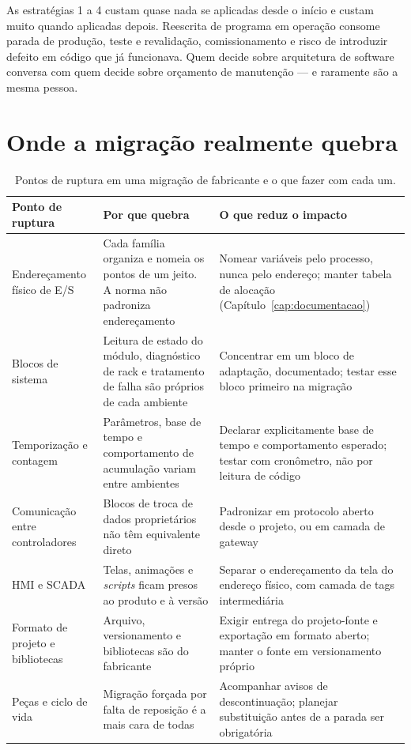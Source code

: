 \begin{atencao}
As estratégias 1 a 4 custam quase nada se aplicadas desde o início e custam muito quando aplicadas
depois. Reescrita de programa em operação consome parada de produção, teste e revalidação,
comissionamento e risco de introduzir defeito em código que já funcionava. Quem decide sobre
arquitetura de software conversa com quem decide sobre orçamento de manutenção --- e raramente são a
mesma pessoa.
\end{atencao}

\section{Onde a migração realmente quebra}

\begin{table}[H]
  \centering
  \caption{Pontos de ruptura em uma migração de fabricante e o que fazer com cada um.}
  \label{tab:rupturas-migracao}
  \begin{tabular}{p{3.4cm} p{5.2cm} p{5.7cm}}
    \toprule
    Ponto de ruptura & Por que quebra & O que reduz o impacto \\
    \midrule
    Endereçamento físico de E/S
      & Cada família organiza e nomeia os pontos de um jeito. A norma não padroniza endereçamento
      & Nomear variáveis pelo processo, nunca pelo endereço; manter tabela de alocação
        (Capítulo~\ref{cap:documentacao}) \\
    \addlinespace
    Blocos de sistema
      & Leitura de estado do módulo, diagnóstico de rack e tratamento de falha são próprios de cada
        ambiente
      & Concentrar em um bloco de adaptação, documentado; testar esse bloco primeiro na migração \\
    \addlinespace
    Temporização e contagem
      & Parâmetros, base de tempo e comportamento de acumulação variam entre ambientes
      & Declarar explicitamente base de tempo e comportamento esperado; testar com cronômetro, não
        por leitura de código \\
    \addlinespace
    Comunicação entre controladores
      & Blocos de troca de dados proprietários não têm equivalente direto
      & Padronizar em protocolo aberto desde o projeto, ou em camada de gateway \\
    \addlinespace
    HMI e SCADA
      & Telas, animações e \emph{scripts} ficam presos ao produto e à versão
      & Separar o endereçamento da tela do endereço físico, com camada de tags intermediária \\
    \addlinespace
    Formato de projeto e bibliotecas
      & Arquivo, versionamento e bibliotecas são do fabricante
      & Exigir entrega do projeto-fonte e exportação em formato aberto; manter o fonte em versionamento
        próprio \\
    \addlinespace
    Peças e ciclo de vida
      & Migração forçada por falta de reposição é a mais cara de todas
      & Acompanhar avisos de descontinuação; planejar substituição antes de a parada ser obrigatória \\
    \bottomrule
  \end{tabular}
\end{table}

